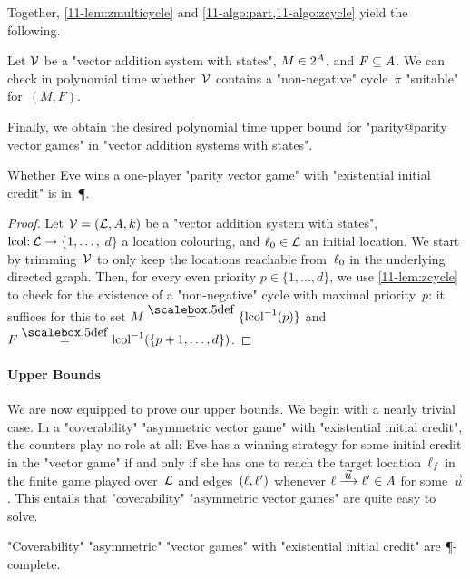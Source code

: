 \begin{scope}
Together, \cref{11-lem:zmulticycle}
and \cref{11-algo:part,11-algo:zcycle} yield the following.

\begin{lemma}
\label{11-lem:zcycle}
  Let $\mathcal V$ be a "vector addition system with states",
  $M\in 2^{A}$, and $F\subseteq A$.  We can check in polynomial
  time whether~$\mathcal V$ contains a "non-negative" cycle~$\pi$
  "suitable" for~$(M,F)$.
\end{lemma}

Finally, we obtain the desired polynomial time upper bound for
"parity@parity vector games" in "vector addition systems with states".
\begin{theorem}
\label{11-thm:zcycle}
  Whether Eve wins a one-player "parity vector game" with
  "existential initial credit" is in~\P.
\end{theorem}
\begin{proof}
  Let $\mathcal V=(\mathcal L,A,k)$ be a "vector addition system with states",
  $\mathrm{lcol}{:}\,\mathcal L\to\{1,\dots,$ $d\}$ a location colouring, and
  $\ell_0\in\mathcal L$ an initial location.  We start by trimming~$\mathcal V$ to
  only keep the locations reachable from~$\ell_0$ in the underlying
  directed graph.  Then, for every even priority $p\in\{1,\dots,d\}$,
  we use \cref{11-lem:zcycle} to check for the existence of a
  "non-negative" cycle with maximal priority~$p$: it suffices for this
  to set $M\eqdef\{\lcol^{-1}(p)\}$ and
  $F\eqdef\lcol^{-1}(\{p+1,\dots,d\})$.
\end{proof}
\end{scope}

\paragraph{Upper Bounds}
We are now equipped to prove our upper bounds.  We begin with a nearly
trivial case.  In a "coverability" "asymmetric vector game" with
"existential initial credit", the counters play no role at all: Eve 
has a winning strategy for some initial credit in the "vector game" if
and only if she has one to reach the target location~$\ell_f$ in the
finite game played over~$\mathcal L$ and edges~$(\ell,\ell')$ whenever
$\loc\step{\vec u}\loc'\in\Act$ for some~$\vec u$.  This entails that
"coverability" "asymmetric vector games" are quite easy to solve.

\begin{theorem}
\label{11-th:cov-exist-P}
  "Coverability" "asymmetric" "vector games" with "existential initial
  credit" are \P-complete.
\end{theorem}


